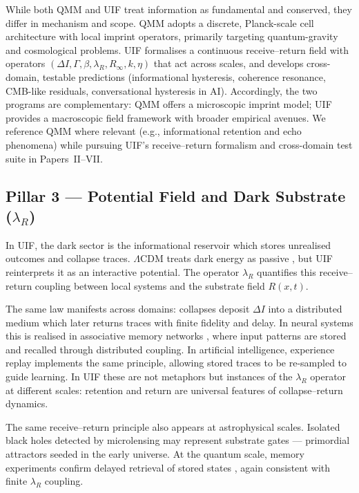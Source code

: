 While both QMM and UIF treat information as fundamental and conserved, they differ in mechanism and scope. QMM adopts a discrete, Planck-scale cell architecture with local imprint operators, primarily targeting quantum-gravity and cosmological problems. UIF formalises a continuous receive–return field with operators $(\Delta I,\Gamma,\beta,\lambda_R,R_\infty,k,\eta)$ that act across scales, and develops cross-domain, testable predictions (informational hysteresis, coherence resonance, CMB-like residuals, conversational hysteresis in AI). Accordingly, the two programs are complementary: QMM offers a microscopic imprint model; UIF provides a macroscopic field framework with broader empirical avenues. We reference QMM where relevant (e.g., informational retention and echo phenomena) while pursuing UIF’s receive–return formalism and cross-domain test suite in Papers~II–VII.



\subsection {Pillar 3 --- Potential Field and Dark Substrate ($\lambda_R$)}
In UIF, the dark sector is the informational reservoir which stores unrealised outcomes and collapse traces. $\Lambda$CDM treats dark energy as passive \cite{Riess1998,Perlmutter1999,Planck2018}, but UIF reinterprets it as an interactive potential. The operator $\lambda_R$ quantifies this receive–return coupling between local systems and the substrate field $R(x,t)$.

The same law manifests across domains: collapses deposit $\Delta I$ into a distributed medium which later returns traces with finite fidelity and delay. In neural systems this is realised in associative memory networks \cite{Hopfield1982}, where input patterns are stored and recalled through distributed coupling. In artificial intelligence, experience replay \cite{Lin1992} implements the same principle, allowing stored traces to be re-sampled to guide learning. In UIF these are not metaphors but instances of the $\lambda_R$ operator at different scales: retention and return are universal features of collapse–return dynamics.

The same receive–return principle also appears at astrophysical scales. Isolated black holes detected by microlensing \cite{Mroz2022b} may represent substrate gates — primordial attractors seeded in the early universe. At the quantum scale, memory experiments confirm delayed retrieval of stored states \cite{Lvovsky2009}, again consistent with finite $\lambda_R$ coupling.

